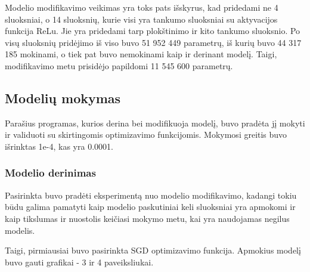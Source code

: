 \documentclass{VUMIFPSkursinis}
\begin{document}
Modelio modifikavimo veikimas yra toks pats išskyrus, kad pridedami ne 4 sluoksniai, o 14 sluoksnių, kurie visi yra tankumo sluoksniai su aktyvacijos funkcija ReLu. Jie yra 
pridedami tarp plokštinimo ir kito tankumo sluoksnio. Po visų sluoksnių pridėjimo iš viso buvo 51 952 449 parametrų, iš kurių buvo 44 317 185 mokinami, o tiek pat buvo nemokinami 
kaip ir derinant modelį. Taigi, modifikavimo metu prisidėjo papildomi 11 545 600 parametrų.

\subsection{Modelių mokymas}
Parašius programas, kurios derina bei modifikuoja modelį, buvo pradėta jį mokyti ir validuoti su skirtingomis optimizavimo funkcijomis.
Mokymosi greitis buvo išrinktas 1e-4, kas yra 0.0001.
\subsubsection{Modelio derinimas}
Pasirinkta buvo pradėti eksperimentą nuo modelio modifikavimo, kadangi tokiu būdu galima pamatyti kaip modelio paskutiniai keli sluoksniai yra apmokomi ir kaip tikslumas ir nuostolis 
keičiasi mokymo metu, kai yra naudojamas negilus modelis.

Taigi, pirmiausiai buvo pasirinkta SGD optimizavimo funkcija. Apmokius modelį buvo gauti grafikai - 3 ir 4 paveiksliukai.
\end{document}
